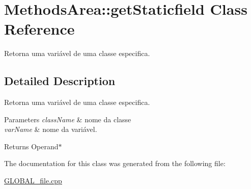 \hypertarget{class_methods_area_1_1get_staticfield}{}\section{Methods\+Area\+:\+:get\+Staticfield Class Reference}
\label{class_methods_area_1_1get_staticfield}


Retorna uma variável de uma classe especifica.  




\subsection{Detailed Description}
Retorna uma variável de uma classe especifica. 


\begin{DoxyParams}{Parameters}
{\em class\+Name} & nome da classe \\
\hline
{\em var\+Name} & nome da variável. \\
\hline
\end{DoxyParams}
\begin{DoxyReturn}{Returns}
Operand$\ast$ 
\end{DoxyReturn}


The documentation for this class was generated from the following file\+:\begin{DoxyCompactItemize}
\item 
\hyperlink{_g_l_o_b_a_l__file_8cpp}{G\+L\+O\+B\+A\+L\+\_\+file.\+cpp}\end{DoxyCompactItemize}
